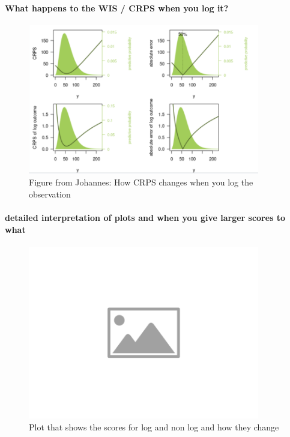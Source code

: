 \documentclass{article}
\begin{document}
\paragraph{What happens to the WIS / CRPS when you log it?}
\begin{figure}[h!]
    \centering
    \includegraphics[width=0.9\textwidth]{output/crps log viz.png}
    \caption{Figure from Johannes: How CRPS changes when you log the observation}
    \label{fig:log-crps-viz}
\end{figure}




\paragraph{detailed interpretation of plots and when you give larger scores to what}

\begin{figure}[h!]
    \centering
    \includegraphics[width=0.9\textwidth]{output/placeholder-image.png}
    \caption{Plot that shows the scores for log and non log and how they change}
    \label{fig:change-in-scores}
\end{figure}
\end{document}
